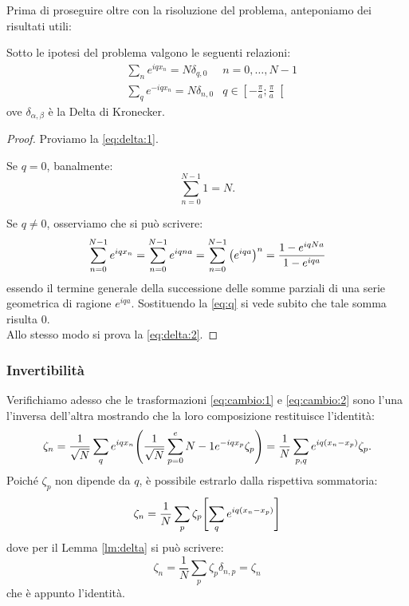         \par Prima di proseguire oltre con la risoluzione del problema, anteponiamo dei risultati utili:
        \begin{lemma} \label{lm:delta}
            Sotto le ipotesi del problema valgono le seguenti relazioni:
            \begin{align}
                &\sum_{n}e^{iqx_n}=N\delta_{q,0} &n=0,\dots,N-1 \label{eq:delta:1}\\
                &\sum_{q}e^{-iqx_n}=N\delta_{n,0} &q\in\left[-\frac{\pi}{a};\frac{\pi}{a}\right[ \label{eq:delta:2}
            \end{align}
        ove $\delta_{\alpha,\beta}$ \`e la Delta di Kronecker.
        \end{lemma}
        \begin{proof}
            Proviamo la \eqref{eq:delta:1}. \par Se $q=0$, banalmente:
                $$\sum_{n=0}^{N-1}1=N.$$
            \par Se $q\neq0$, osserviamo che si pu\`o scrivere:
                $$\sum_{n=0}^{N-1} e^{iqx_n}=\sum_{n=0}^{N-1} e^{iqna}=\sum_{n=0}^{N-1}\qty(e^{iqa})^n=\frac{1-e^{iqNa}}{1-e^{iqa}}$$
            essendo il termine generale della successione delle somme parziali di una serie geometrica di ragione $e^{iqa}$. Sostituendo la \eqref{eq:q} si vede subito che tale somma risulta $0$. \\ Allo stesso modo si prova la \eqref{eq:delta:2}.
        \end{proof}
        \subsubsection{Invertibilit\`a}
            Verifichiamo adesso che le trasformazioni \eqref{eq:cambio:1} e \eqref{eq:cambio:2} sono l'una l'inversa dell'altra mostrando che la loro composizione restituisce l'identit\`a: $$\zeta_n=\frac{1}{\sqrt{N}}\sum_{q}e^{iqx_n}\qty(\frac{1}{\sqrt{N}}\sum_{p=0}^e{N-1}e^{-iqx_p}\zeta_p)=\frac{1}{N}\sum_{p,q}e^{iq\qty(x_n-x_p)}\zeta_p.$$ Poich\'e $\zeta_p$ non dipende da $q$, \`e possibile estrarlo dalla rispettiva sommatoria:
                $$\zeta_n=\frac{1}{N}\sum_p\zeta_p\qty[\sum_q e^{iq\qty(x_n-x_p)}]$$
            dove per il Lemma \ref{lm:delta} si pu\`o scrivere:
                $$\zeta_n=\frac{1}{N}\sum_p\zeta_p\delta_{n,p}=\zeta_n$$
            che \`e appunto l'identit\`a.
